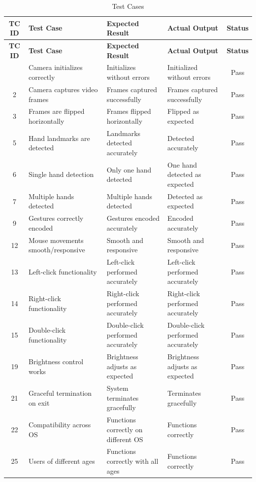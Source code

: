 \documentclass[12pt,a4paper]{report}
\begin{document}
\begin{longtable}{c p{4cm} p{3cm} p{3cm} c}
\caption{Test Cases} \label{tab:testcases} \\
\toprule
\textbf{TC ID} & \textbf{Test Case} & \textbf{Expected Result} & \textbf{Actual Output} & \textbf{Status} \\
\midrule
\endfirsthead
\toprule
\textbf{TC ID} & \textbf{Test Case} & \textbf{Expected Result} & \textbf{Actual Output} & \textbf{Status} \\
\midrule
\endhead
\bottomrule
\endfoot
1  & Camera initializes correctly              & Initializes without errors       & Initialized without errors      & Pass \\
2  & Camera captures video frames              & Frames captured successfully     & Frames captured successfully    & Pass \\
3  & Frames are flipped horizontally           & Frames flipped horizontally      & Flipped as expected             & Pass \\
5  & Hand landmarks are detected               & Landmarks detected accurately    & Detected accurately             & Pass \\
6  & Single hand detection                     & Only one hand detected           & One hand detected as expected   & Pass \\
7  & Multiple hands detected                   & Multiple hands detected          & Detected as expected             & Pass \\
9  & Gestures correctly encoded                & Gestures encoded accurately      & Encoded accurately              & Pass \\
12 & Mouse movements smooth/responsive         & Smooth and responsive            & Smooth and responsive           & Pass \\
13 & Left-click functionality                  & Left-click performed accurately  & Left-click performed accurately & Pass \\
14 & Right-click functionality                 & Right-click performed accurately & Right-click performed accurately & Pass \\
15 & Double-click functionality                & Double-click performed accurately & Double-click performed accurately & Pass \\
19 & Brightness control works                  & Brightness adjusts as expected   & Brightness adjusts as expected  & Pass \\
21 & Graceful termination on exit              & System terminates gracefully     & Terminates gracefully           & Pass \\
22 & Compatibility across OS                   & Functions correctly on different OS & Functions correctly           & Pass \\
25 & Users of different ages                   & Functions correctly with all ages & Functions correctly            & Pass \\
\end{longtable}
\end{document}
